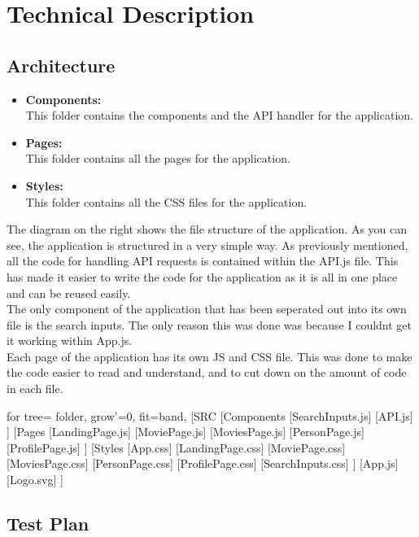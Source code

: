 \documentclass[12pt,a4paper]{article}
\begin{document}
	\section{Technical Description}
		\subsection{Architecture}
			\begin{minipage}[t]{0.6\textwidth}
			  	\begin{itemize}
					\item \textbf{Components:}\\
						This folder contains the components and the API handler for the application.
					\item \textbf{Pages:}\\
						This folder contains all the pages for the application.
					\item \textbf{Styles:}\\
						This folder contains all the CSS files for the application.
			  	\end{itemize}

				The diagram on the right shows the file structure of the application. As you can see, the 
				application is structured in a very simple way. As previously mentioned, all the code for 
				handling API requests is contained within the API.js file. This has made it easier to write 
				the code for the application as it is all in one place and can be reused easily.\\
				
				The only component of the application that has been seperated out into its own file is the 
				search inputs. The only reason this was done was because I couldnt get it working within 
				App.js.\\

				Each page of the application has its own JS and CSS file. This was done to make the code 
				easier to read and understand, and to cut down on the amount of code in each file.\\
			\end{minipage}
			\hfill
			\begin{minipage}[t]{0.3\textwidth} 
				\vspace{0pt}
				\begin{forest}
				for tree={
				  folder,
				  grow'=0,
				  fit=band,
				}
				[SRC
				  [Components
					[SearchInputs.js]
					[API.js]
				  ]
				  [Pages
					[LandingPage.js]
					[MoviePage.js]
					[MoviesPage.js]
					[PersonPage.js]
					[ProfilePage.js]
				  ]
				  [Styles
					[App.css]
					[LandingPage.css]
					[MoviePage.css]
					[MoviesPage.css]
					[PersonPage.css]
					[ProfilePage.css]
					[SearchInputs.css]
				  ]
				  [App.js]
				  [Logo.svg]
				]
			  \end{forest}
			\end{minipage}
			\newpage
		\subsection{Test Plan}
			
\end{document}
